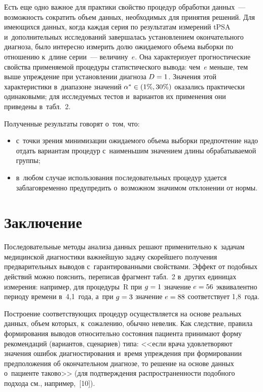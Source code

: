 \begin{multicols}{2}
\vspace*{10pt}
     
     Есть еще одно важное для практики свойство процедур обработки 
данных~--- возможность сократить объем данных, необходимых для принятия 
решений. Для имеющихся данных, когда каждая серия по результатам 
измерений tPSA и~дополнительных исследований завершалась установлением 
окончательного диагноза, было интересно измерить долю ожидаемого объема 
выборки по отношению к~длине серии~--- величину~$e$. Она характеризует 
прогностические свойства применяемой процедуры статистического вывода: 
чем~$e$ меньше, тем выше упреждение при установлении диагноза $D\hm=1$. 
Значения этой характеристики в~диапазоне значений $\alpha^*\hm\in (1\%, 
30\%)$ оказались практически одинаковыми; для исследуемых тестов 
и~вариантов их применения они приведены в~табл.~2.
     

     
     Полученные результаты говорят о~том, что:
     \begin{itemize}
\item с~точки зрения минимизации ожидаемого объема выборки 
предпочтение надо отдать вариантам процедур с~наименьшим значением 
длины обрабатываемой группы;
\item в~любом случае использования последовательных процедур удается 
заблаговременно предупредить о~возможном значимом отклонении от 
нормы.
\end{itemize}

\section{Заключение}

     Последовательные методы анализа данных решают применительно 
к~задачам медицинской диагностики важнейшую задачу скорейшего 
получения предварительных выводов с~гарантированными свойствами. 
Эффект от подобных действий можно пояснить, переписав фрагмент табл.~2 
в~других единицах измерения: например, для процедуры~R при $g\hm=1$ 
значение $e\hm = 56$ эквивалентно периоду времени в~4,1~года, а~при $g\hm = 
3$ значение $e\hm = 88$ соответствует 1,8~года. 
     
     Построение соответствующих процедур осуществляется на основе 
реальных данных, объем которых, к~сожалению, обычно невелик. Как 
следствие, правила формирования выводов \mbox{относительно} состояния пациента 
принимают форму рекомендаций (вариантов, сценариев) типа: <<если врача 
удовле\-тво\-ря\-ют значения ошибок диагностирования и~время упреждения при 
формировании предположения об окончательном диагнозе, то решение на 
основе данных о~пациенте таково>> (для подтверждения распространенности 
подобного подхода см., например,~[10]).
     

\end{multicols}
